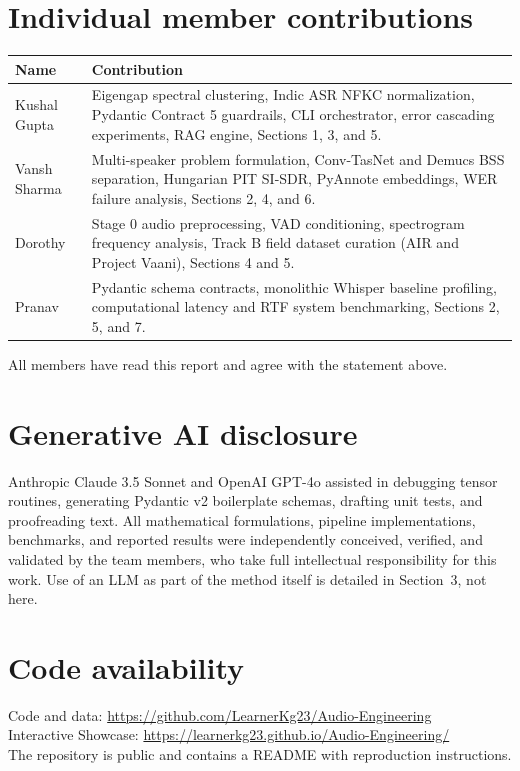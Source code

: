 \documentclass[11pt,a4paper,twocolumn]{article}
\newcommand{\githuburl}{https://github.com/LearnerKg23/Audio-Engineering}
\newcommand{\demourl}{https://learnerkg23.github.io/Audio-Engineering/}
\begin{document}
\section*{Individual member contributions}
{\small
\begin{tabularx}{\linewidth}{@{}l X@{}}
\toprule
Name & Contribution \\
\midrule
Kushal Gupta & Eigengap spectral clustering, Indic ASR NFKC normalization, Pydantic Contract 5 guardrails, CLI orchestrator, error cascading experiments, RAG engine, Sections 1, 3, and 5. \\
Vansh Sharma & Multi-speaker problem formulation, Conv-TasNet and Demucs BSS separation, Hungarian PIT SI-SDR, PyAnnote embeddings, WER failure analysis, Sections 2, 4, and 6. \\
Dorothy & Stage 0 audio preprocessing, VAD conditioning, spectrogram frequency analysis, Track B field dataset curation (AIR and Project Vaani), Sections 4 and 5. \\
Pranav & Pydantic schema contracts, monolithic Whisper baseline profiling, computational latency and RTF system benchmarking, Sections 2, 5, and 7. \\
\bottomrule
\end{tabularx}}

\smallskip
\noindent All members have read this report and agree with the statement above.

\section*{Generative AI disclosure}
Anthropic Claude 3.5 Sonnet and OpenAI GPT-4o assisted in debugging tensor routines, generating Pydantic v2 boilerplate schemas, drafting unit tests, and proofreading text. All mathematical formulations, pipeline implementations, benchmarks, and reported results were independently conceived, verified, and validated by the team members, who take full intellectual responsibility for this work. Use of an LLM as part of the method itself is detailed in Section~3, not here.

\section*{Code availability}
\noindent Code and data: \url{\githuburl}\\
\noindent Interactive Showcase: \url{\demourl}\\
The repository is public and contains a README with reproduction instructions.
\end{document}
